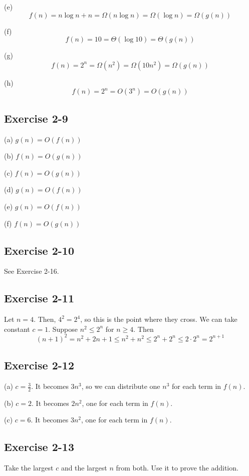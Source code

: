 \documentclass{book}
\begin{document}
\noindent
(e)
$$f(n) = n \log n + n = \Omega(n \log n) = \Omega(\log n) = \Omega(g(n))$$

\noindent
(f)
$$f(n) = 10 = \Theta(\log 10) = \Theta(g(n))$$

\noindent
(g)
$$f(n) = 2^n = \Omega(n^2) = \Omega(10n^2) = \Omega(g(n))$$

\noindent
(h)
$$f(n) = 2^n = O(3^n) = O(g(n))$$

\subsection*{Exercise 2-9}
(a)
$g(n) = O(f(n))$

\noindent
(b)
$f(n) = O(g(n))$

\noindent
(c)
$f(n) = O(g(n))$

\noindent
(d)
$g(n) = O(f(n))$

\noindent
(e)
$g(n) = O(f(n))$

\noindent
(f)
$f(n) = O(g(n))$

\subsection*{Exercise 2-10}
See Exercise 2-16.

\subsection*{Exercise 2-11}
Let $n = 4$. Then, $4^2 = 2^4$, so this is the point where they cross. We can take constant $c = 1$. Suppose $n^2 \leq 2^n$ for $n \geq 4$. Then
$$(n + 1)^2 = n^2 + 2n + 1 \leq n^2 + n^2 \leq 2^n + 2^n \leq 2 \cdot 2^n = 2^{n + 1}$$

\subsection*{Exercise 2-12}
(a) $c = \frac{3}{2}$. It becomes $3n^3$, so we can distribute one $n^3$ for each term in $f(n)$.

\noindent
(b) $c = 2$. It becomes $2n^2$, one for each term in $f(n)$.

\noindent
(c) $c = 6$. It becomes $3n^2$, one for each term in $f(n)$.

\subsection*{Exercise 2-13}
Take the largest $c$ and the largest $n$ from both. Use it to prove the addition.
\end{document}
